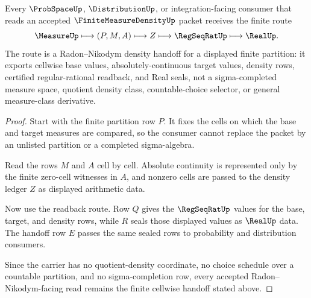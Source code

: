 \begin{theorem}
\label{thm:finite-measure-density-radon-nikodym-handoff}
Every $\ProbSpaceUp$, $\DistributionUp$, or integration-facing consumer that reads an accepted $\FiniteMeasureDensityUp$ packet receives the finite route
$$
\MeasureUp \longmapsto (P,M,A) \longmapsto Z \longmapsto \RegSeqRatUp \longmapsto \RealUp .
$$
The route is a Radon--Nikodym density handoff for a displayed finite partition: it exports cellwise base values, absolutely-continuous target values, density rows, certified regular-rational readback, and Real seals, not a sigma-completed measure space, quotient density class, countable-choice selector, or general measure-class derivative.
\end{theorem}
\begin{proof}
Start with the finite partition row $P$. It fixes the cells on which the base and target measures are compared, so the consumer cannot replace the packet by an unlisted partition or a completed sigma-algebra.

Read the rows $M$ and $A$ cell by cell. Absolute continuity is represented only by the finite zero-cell witnesses in $A$, and nonzero cells are passed to the density ledger $Z$ as displayed arithmetic data.

Now use the readback route. Row $Q$ gives the $\RegSeqRatUp$ values for the base, target, and density rows, while $R$ seals those displayed values as $\RealUp$ data. The handoff row $E$ passes the same sealed rows to probability and distribution consumers.

Since the carrier has no quotient-density coordinate, no choice schedule over a countable partition, and no sigma-completion row, every accepted Radon--Nikodym-facing read remains the finite cellwise handoff stated above.
\end{proof}



